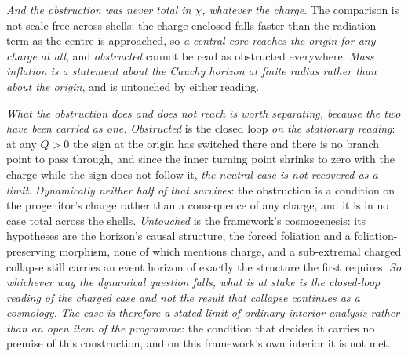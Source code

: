 \documentclass[11pt,a4paper]{article}
\theoremstyle{definition}
\begin{document}
\emph{And the obstruction was never total in $\chi$, whatever the charge.} The comparison is not scale-free
across shells: the charge enclosed falls faster than the radiation term as the centre is approached, so
\emph{a central core reaches the origin for any charge at all}, and \emph{obstructed} cannot be read as
obstructed everywhere. \emph{Mass inflation is a statement about the Cauchy horizon at finite radius rather
than about the origin}, and is untouched by either reading.

\emph{What the obstruction does and does not reach is worth separating, because the two have been carried as
one.} \emph{Obstructed} is the closed loop \emph{on the stationary reading}: at any $Q>0$ the sign at the origin
has switched there and there is no branch point to pass through, and since the inner turning point shrinks to
zero with the charge while the sign does not follow it, \emph{the neutral case is not recovered as a limit}.
\emph{Dynamically neither half of that survives}: the obstruction is a condition on the progenitor's charge
rather than a consequence of any charge, and it is in no case total across the shells. \emph{Untouched} is the
framework's cosmogenesis: its hypotheses are the horizon's causal structure, the forced foliation and a
foliation-preserving morphism, none of which mentions charge, and a sub-extremal charged collapse still
carries an event horizon of exactly the structure the first
requires. \emph{So whichever way the
dynamical question falls, what is at stake is the closed-loop reading of the charged case and not the result
that collapse continues as a cosmology.} \emph{The case is therefore a stated limit of ordinary interior
analysis rather than an open item of the programme}: the condition that decides it carries no premise of this
construction, and on this framework's own interior it is not met.
\end{document}
